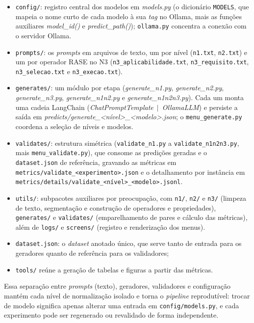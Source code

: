 \begin{itemize}
    \item \texttt{config/}: registro central dos modelos em \textit{models.py} (o dicionário \texttt{MODELS}, que mapeia o nome curto de cada modelo à sua \textit{tag} no Ollama, mais as funções auxiliares \textit{model\_id()} e \textit{predict\_path()}); \texttt{ollama.py} concentra a conexão com o servidor Ollama.
    \item \texttt{prompts/}: os \textit{prompts} em arquivos de texto, um por nível (\texttt{n1.txt}, \texttt{n2.txt}) e um por operador RASE no N3 (\texttt{n3\_aplicabilidade.txt}, \texttt{n3\_requisito.txt}, \texttt{n3\_selecao.txt} e \texttt{n3\_execao.txt}).
    \item \texttt{generates/}: um módulo por etapa (\textit{generate\_n1.py}, \textit{generate\_n2.py}, \textit{generate\_n3.py}, \textit{generate\_n1n2.py} e \textit{generate\_n1n2n3.py}). Cada um monta uma cadeia LangChain (\textit{ChatPromptTemplate}~$\mid$~\textit{OllamaLLM}) e persiste a saída em \textit{predicts/generate\_<nível>\_<modelo>.json}; o \texttt{menu\_generate.py} coordena a seleção de níveis e modelos.
    \item \texttt{validates/}: estrutura simétrica (\texttt{validate\_n1.py} a \texttt{validate\_n1n2n3.py}, mais \texttt{menu\_validate.py}), que consome as predições geradas e o \texttt{dataset.json} de referência, gravando as métricas em \texttt{metrics/validate\_<experimento>.json} e o detalhamento por instância em \texttt{metrics/details/validate\_<nível>\_<modelo>.jsonl}.
    \item \texttt{utils/}: subpacotes auxiliares por preocupação, com \texttt{n1/}, \texttt{n2/} e \texttt{n3/} (limpeza de texto, segmentação e construção de operadores e propriedades), \texttt{generates/} e \texttt{validates/} (emparelhamento de pares e cálculo das métricas), além de \texttt{logs/} e \texttt{screens/} (registro e renderização dos menus).
    \item \texttt{dataset.json}: o \textit{dataset} anotado único, que serve tanto de entrada para os geradores quanto de referência para os validadores; 
		\item \texttt{tools/} reúne a geração de tabelas e figuras a partir das métricas.
\end{itemize}

Essa separação entre \textit{prompts} (texto), geradores, validadores e configuração mantém cada nível de normalização isolado e torna o \textit{pipeline} reprodutível: trocar de modelo significa apenas alterar uma entrada em \texttt{config/models.py}, e cada experimento pode ser regenerado ou revalidado de forma independente.

